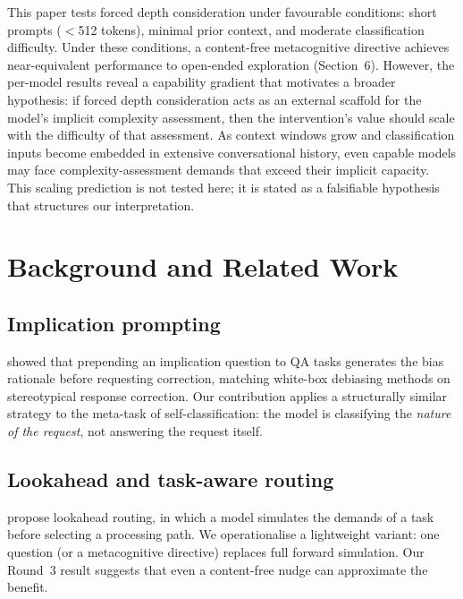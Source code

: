 \documentclass[11pt,a4paper]{article}
\begin{document}
This paper tests forced depth consideration under favourable conditions:
short prompts ($<$512 tokens), minimal prior context, and moderate
classification difficulty.  Under these conditions, a content-free
metacognitive directive achieves near-equivalent performance to open-ended
exploration (Section~6).  However, the per-model results reveal a
capability gradient that motivates a broader hypothesis: if forced depth
consideration acts as an external scaffold for the model's implicit
complexity assessment, then the intervention's value should scale with the
difficulty of that assessment.  As context windows grow and classification
inputs become embedded in extensive conversational history, even capable
models may face complexity-assessment demands that exceed their implicit
capacity.  This scaling prediction is not tested here; it is stated as a
falsifiable hypothesis that structures our interpretation.

\section{Background and Related Work}
\label{sec:background}

\subsection{Implication prompting}

\citet{Furniturewala2024} showed that prepending an implication question to
QA tasks generates the bias rationale before requesting correction,
matching white-box debiasing methods on stereotypical response correction.
Our contribution applies a structurally similar strategy to the meta-task
of self-classification: the model is classifying the \emph{nature of the
request}, not answering the request itself.

\subsection{Lookahead and task-aware routing}

\citet{Huang2025} propose lookahead routing, in which a model simulates the
demands of a task before selecting a processing path.  We operationalise a
lightweight variant: one question (or a metacognitive directive) replaces
full forward simulation.  Our Round~3 result suggests that even a
content-free nudge can approximate the benefit.
\end{document}
